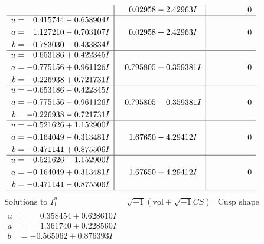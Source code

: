 \documentclass[1p]{elsarticle_modified}
\theoremstyle{definition}
\newcommand{\I}{\sqrt{-1}}
\begin{document}
$$\begin{array}{c|c|c}
 & \phantom{-}0.02958 - 2.42963 I & \phantom{-0.000000 } 0 \\ \hline\begin{aligned}
u &= \phantom{-}0.415744 - 0.658904 I \\
a &= \phantom{-}1.127210 - 0.703107 I \\
b &= -0.783030 - 0.433834 I\end{aligned}
 & \phantom{-}0.02958 + 2.42963 I & \phantom{-0.000000 } 0 \\ \hline\begin{aligned}
u &= -0.653186 + 0.422345 I \\
a &= -0.775156 + 0.961126 I \\
b &= -0.226938 + 0.721731 I\end{aligned}
 & \phantom{-}0.795805 + 0.359381 I & \phantom{-0.000000 } 0 \\ \hline\begin{aligned}
u &= -0.653186 - 0.422345 I \\
a &= -0.775156 - 0.961126 I \\
b &= -0.226938 - 0.721731 I\end{aligned}
 & \phantom{-}0.795805 - 0.359381 I & \phantom{-0.000000 } 0 \\ \hline\begin{aligned}
u &= -0.521626 + 1.152900 I \\
a &= -0.164049 - 0.313481 I \\
b &= -0.471141 + 0.875506 I\end{aligned}
 & \phantom{-}1.67650 - 4.29412 I & \phantom{-0.000000 } 0 \\ \hline\begin{aligned}
u &= -0.521626 - 1.152900 I \\
a &= -0.164049 + 0.313481 I \\
b &= -0.471141 - 0.875506 I\end{aligned}
 & \phantom{-}1.67650 + 4.29412 I & \phantom{-0.000000 } 0\\
 \hline 
 \end{array}$$\newpage$$\begin{array}{c|c|c}  
\text{Solutions to }I^u_{1}& \I (\text{vol} + \sqrt{-1}CS) & \text{Cusp shape}\\
 \hline 
\begin{aligned}
u &= \phantom{-}0.358454 + 0.628610 I \\
a &= \phantom{-}1.361740 + 0.228560 I \\
b &= -0.565062 + 0.876393 I\end{aligned}

\end{array}$$
\end{document}
